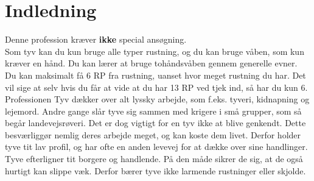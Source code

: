 
\chapter*{Indledning}

Denne profession kræver \textbf{ikke} special ansøgning.\\
Som tyv kan du kun bruge alle typer rustning, og du kan bruge våben, som kun kræver en hånd. Du kan lærer at bruge tohåndsvåben gennem generelle evner.\\
Du kan maksimalt få 6 RP fra rustning, uanset hvor meget rustning du har. Det vil sige at selv hvis du får at vide at du har 13 RP ved tjek ind, så har du kun 6.\\

Professionen Tyv dækker over alt lyssky arbejde, som f.eks. tyveri, kidnapning og lejemord. Andre
gange slår tyve sig sammen med krigere i små grupper, som så begår landevejsrøveri. Det er dog vigtigt for en tyv ikke at blive genkendt. Dette besværliggør nemlig deres arbejde meget, og kan koste dem livet. Derfor holder tyve tit lav profil, og har ofte en anden levevej for at dække over sine handlinger.\\
Tyve efterligner tit borgere og handlende. På den måde sikrer de sig, at de også hurtigt
kan slippe væk. Derfor bærer tyve ikke larmende rustninger eller skjolde.\\

